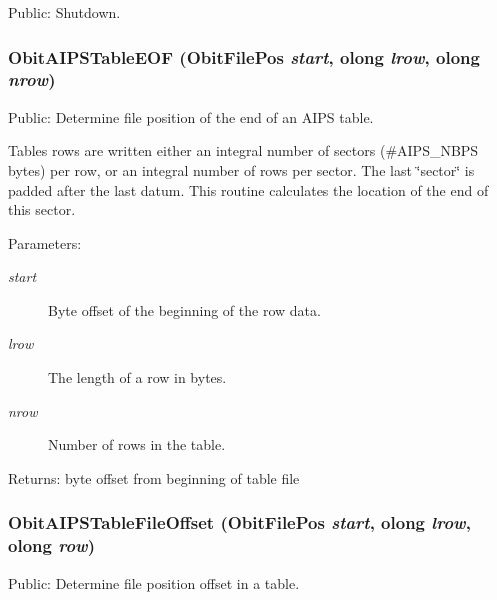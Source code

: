 Public: Shutdown. 

\subsubsection{ Obit\-AIPSTable\-EOF ({\bf Obit\-File\-Pos} {\em start}, {\bf olong} {\em lrow}, {\bf olong} {\em nrow})}\label{ObitAIPS_8c_a14}


Public: Determine file position of the end of an AIPS table. 

Tables rows are written either an integral number of sectors (\#AIPS\_\-NBPS bytes) per row, or an integral number of rows per sector. The last \char`\"{}sector\char`\"{} is padded after the last datum. This routine calculates the location of the end of this sector. \begin{Desc}
\item[Parameters:]
\begin{description}
\item[{\em start}]Byte offset of the beginning of the row data. \item[{\em lrow}]The length of a row in bytes. \item[{\em nrow}]Number of rows in the table. \end{description}
\end{Desc}
\begin{Desc}
\item[Returns:]byte offset from beginning of table file \end{Desc}
\subsubsection{ Obit\-AIPSTable\-File\-Offset ({\bf Obit\-File\-Pos} {\em start}, {\bf olong} {\em lrow}, {\bf olong} {\em row})}\label{ObitAIPS_8c_a13}


Public: Determine file position offset in a table. 

